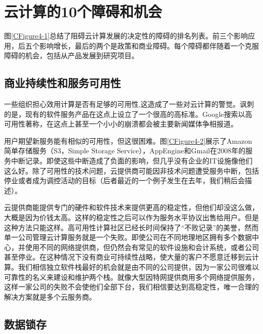 
\section{云计算的10个障碍和机会}

图\ref{CFigure4-1}总结了阻碍云计算发展的决定性的障碍的排名列表。前三个影响应用，后五个影响增长，最后的两个是政策和商业障碍。每个障碍都伴随着一个克服障碍的机会，包括从产品发展到研究项目。


\subsection{商业持续性和服务可用性}

一些组织担心效用计算是否有足够的可用性,这造成了一些对云计算的警觉。讽刺的是，现有的软件服务产品在这点上设立了一个很高的高标准。Google搜索以高可用性著称，在这点上甚至一个小小的崩溃都会被主要新闻媒体争相报道。

用户期望新服务能有相似的可用性，但这很困难。图\ref{CFigure4-2}展示了Amazon简单存储服务（S3，Simple Storage Service），AppEngine和Gmail在2008年的服务中断记录。即使这些中断造成了负面的影响，但几乎没有企业的IT设施像他们这么好。除了可用性的技术问题，云提供商可能因非技术问题遭受服务中断，包括停业或者成为调控活动的目标（后者最近的一个例子发生在去年，我们稍后会描述）。

云提供商能提供专门的硬件和软件技术来提供更高的稳定性，但他们却没这么做，大概是因为价钱太高。这样的稳定性之后可以作为服务水平协议出售给用户。但是这种方法只能这样。高可用性计算社区已经长时间保持了“不败记录”的美誉，然而单一公司管理云计算服务就是一个失败。即使公司在不同地理地区拥有多个数据中心，并使用不同的网络提供商，但仍然会有常见的软件设施和会计系统，或者公司甚至停业。在这种情况下没有商业可持续性战略，使大量的客户不愿意迁移到云计算。我们相信独立软件栈最好的机会就是由不同的公司提供，因为一家公司很难以可靠性的名义来建设和维护两个栈。就像大型因特网提供商用多个网络提供服务，这样一家公司的失败不会使他们全部下台，我们相信要达到高稳定性，唯一合理的解决方案就是多个云服务商。


\subsection{数据锁存}

